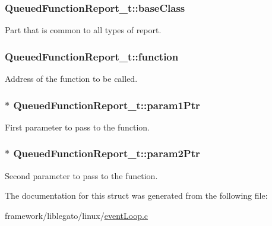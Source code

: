 \subsubsection[{\texorpdfstring{base\+Class}{baseClass}}]{ Queued\+Function\+Report\+\_\+t\+::base\+Class}\hypertarget{struct_queued_function_report__t_a86e995280cca922b16941c25402107cb}{}\label{struct_queued_function_report__t_a86e995280cca922b16941c25402107cb}


Part that is common to all types of report. 

\subsubsection[{\texorpdfstring{function}{function}}]{ Queued\+Function\+Report\+\_\+t\+::function}\hypertarget{struct_queued_function_report__t_a9959977af45c63ecca8b6f300b330f9a}{}\label{struct_queued_function_report__t_a9959977af45c63ecca8b6f300b330f9a}


Address of the function to be called. 

\subsubsection[{\texorpdfstring{param1\+Ptr}{param1Ptr}}]{$\ast$ Queued\+Function\+Report\+\_\+t\+::param1\+Ptr}\hypertarget{struct_queued_function_report__t_a6d241c86ac478bea83745e1b680bf4fa}{}\label{struct_queued_function_report__t_a6d241c86ac478bea83745e1b680bf4fa}


First parameter to pass to the function. 

\subsubsection[{\texorpdfstring{param2\+Ptr}{param2Ptr}}]{$\ast$ Queued\+Function\+Report\+\_\+t\+::param2\+Ptr}\hypertarget{struct_queued_function_report__t_ad0c4ded7e1c5876a792fc8f857c1962a}{}\label{struct_queued_function_report__t_ad0c4ded7e1c5876a792fc8f857c1962a}


Second parameter to pass to the function. 



The documentation for this struct was generated from the following file\+:\begin{DoxyCompactItemize}
\item 
framework/liblegato/linux/\hyperlink{event_loop_8c}{event\+Loop.\+c}\end{DoxyCompactItemize}
